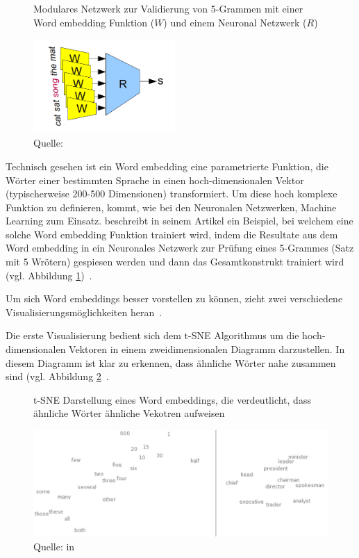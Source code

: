 \documentclass{hwz}
\begin{document}
\begin{figure} 
    \caption{Modulares Netzwerk zur Validierung von 5-Grammen mit einer Word embedding Funktion ($W$) und einem Neuronal Netzwerk ($R$)}
    \label{wordembeddingtraining}
    \centering
    \includegraphics[width=0.48\textwidth]{graphics/wordembeddingtraining.png}
    \caption*{Quelle: \textcite{Olah2014DeepRepresentations}}
\end{figure}
Technisch gesehen ist ein Word embedding eine parametrierte Funktion, die Wörter einer bestimmten Sprache in einen hoch-dimensionalen Vektor (typischerweise 200-500 Dimensionen) transformiert. Um diese hoch komplexe Funktion zu definieren, kommt, wie bei den Neuronalen Netzwerken, Machine Learning zum Einsatz. \textcite{Olah2014NeuralTopology} beschreibt in seinem Artikel ein Beispiel, bei welchem eine solche Word embedding Funktion trainiert wird, indem die Resultate aus dem Word embedding in ein Neuronales Netzwerk zur Prüfung eines 5-Grammes (Satz mit 5 Wrötern) gespiesen werden und dann das Gesamtkonstrukt trainiert wird (vgl. Abbildung \ref{wordembeddingtraining})~\autocite{Olah2014NeuralTopology}.

Um sich Word embeddings besser vorstellen zu können, zieht \textcite{Olah2014DeepRepresentations} zwei verschiedene Visualisierungsmöglichkeiten heran~\autocite{Olah2014DeepRepresentations}.

Die erste Visualisierung bedient sich dem t-SNE Algorithmus um die hoch-dimensionalen Vektoren in einem zweidimensionalen Diagramm darzustellen. In diesem Diagramm ist klar zu erkennen, dass ähnliche Wörter nahe zusammen sind (vgl. Abbildung \ref{wordembeddingtsne}~\autocite{Olah2014DeepRepresentations}.
\begin{figure}[h]
    \centering
    \caption{t-SNE Darstellung eines Word embeddings, die verdeutlicht, dass ähnliche Wörter ähnliche Vekotren aufweisen}
    \includegraphics[width=\textwidth]{graphics/wordmebeddingtsne.png}
    \caption*{Quelle: \textcite{Turian2010WordLearning} in \textcite{Olah2014DeepRepresentations}}
    \label{wordembeddingtsne}
\end{figure}
\end{document}
